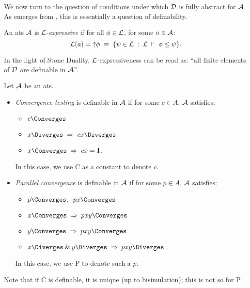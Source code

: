 We now turn to the question of conditions under which $\cal D$ is 
fully abstract for $\cal A$. 
As emerges from \cite{Plo77,Mil77}, this is essentially a question of definability.
\begin{definition}
{\rm An ats $\cal A$ is $\cal L$-{\em expressive} if for all $\phi \in {\cal L}$, for some $a \in {\cal A}$:
\[ {\cal L}(a) = {\uparrow} \phi \; \equiv \; \{ \psi \in {\cal L} \; : \; {\cal L} \: \vdash \: \phi \leq \psi \} . \]
}
\end{definition}
In the light of Stone Duality, $\cal L$-expressiveness can be read as: ``all finite elements of $\cal D$ are definable in $\cal A$''.
\begin{definition}
\label{Cdef}
{\rm Let $\cal A$ be an ats.
\begin{itemize}
\item {\em Convergence testing} is definable in $\cal A$ if for some $c \in  A$, $\cal A$ satisfies:
\begin{itemize}
\item $c {\Converges}$
\item $x {\Diverges} \; \Rightarrow \; c x {\Diverges}$
\item $x {\Converges} \; \Rightarrow \; cx = {\bf I}$.
\end{itemize}
In this case, we use {\sf C} as a constant to denote $c$.
\item {\em Parallel convergence} is definable in $\cal A$ if for some $p \in  A$, $\cal A$ satisfies:
\begin{itemize}
\item $p {\Converges} , \;\; p x {\Converges}$
\item $x {\Converges} \; \Rightarrow \; p x y {\Converges}$
\item $y {\Converges} \; \Rightarrow \; p x y {\Converges}$
\item $x {\Diverges} \: \& \: y {\Diverges} \; \Rightarrow \; p x y {\Diverges}$ .
\end{itemize}
In this case, we use {\sf P} to denote such a $p$.
\end{itemize}}
\end{definition}
Note that if {\sf C} is definable, it is unique (up to bisimulation); this is not so for {\sf P}.

